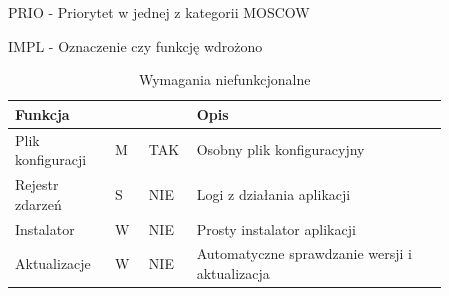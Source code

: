 \documentclass[a4paper,10pt, twoside]{report}
\newcommand{\customstyletable}[1]{\footnotesize{\textbf{#1}}}
\newcommand{\customstyletablecentered}[1]{\footnotesize\centering{\textbf{#1}}}
\begin{document}
\begin{large}
{PRIO - Priorytet w jednej z kategorii MOSCOW \cite{MOSCOW}}

{IMPL - Oznaczenie czy funkcję wdrożono}

\begin{table}[H] %
    \caption{Wymagania niefunkcjonalne}
    \label{Wymagania niefunkcjonalne}
    \footnotesize
    \begin{tabular}{|p{0.2\linewidth}|p{0.07\linewidth}|p{0.07\linewidth}|p{0.52\linewidth}|}  %
    \hline                  %
    \customstyletable{Funkcja} & \customstyletablecentered{PRIO} & \customstyletablecentered{IMPL}& \customstyletable{Opis} \\
    \hline
    {Plik konfiguracji} & {M} & {TAK} & {Osobny plik konfiguracyjny}\\
    \hline
    {Rejestr zdarzeń} & {S} & {NIE} & {Logi z działania aplikacji}\\
    \hline
    {Instalator} & {W} & {NIE} & {Prosty instalator aplikacji}\\
    \hline
    {Aktualizacje} & {W} & {NIE} & {Automatyczne sprawdzanie wersji i aktualizacja}\\
    \hline
    \end{tabular}
\end{table}


\end{large}
\end{document}
